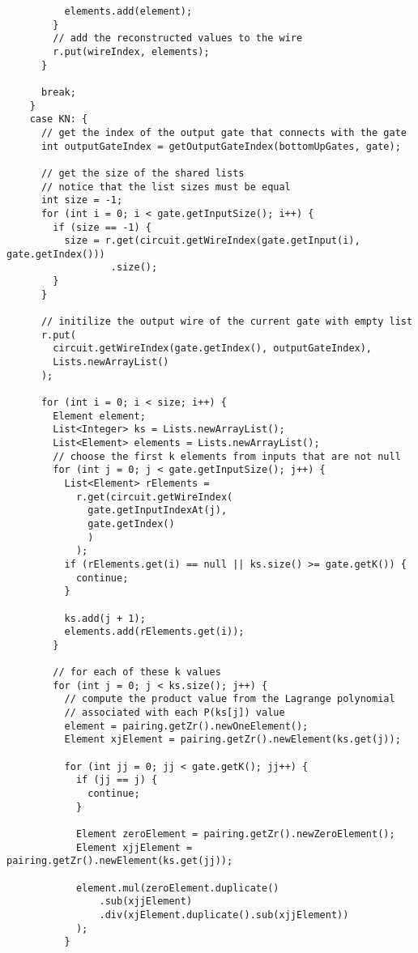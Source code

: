 \documentclass[12pt]{article}
\begin{document}
\begin{lstlisting}
          elements.add(element);
        }
        // add the reconstructed values to the wire
        r.put(wireIndex, elements);
      }

      break;
    }
    case KN: {
      // get the index of the output gate that connects with the gate
      int outputGateIndex = getOutputGateIndex(bottomUpGates, gate);

      // get the size of the shared lists
      // notice that the list sizes must be equal
      int size = -1;
      for (int i = 0; i < gate.getInputSize(); i++) {
        if (size == -1) {
          size = r.get(circuit.getWireIndex(gate.getInput(i), gate.getIndex()))
                  .size();
        }
      }

      // initilize the output wire of the current gate with empty list
      r.put(
        circuit.getWireIndex(gate.getIndex(), outputGateIndex), 
        Lists.newArrayList()
      );
      
      for (int i = 0; i < size; i++) {
        Element element;
        List<Integer> ks = Lists.newArrayList();
        List<Element> elements = Lists.newArrayList();
        // choose the first k elements from inputs that are not null
        for (int j = 0; j < gate.getInputSize(); j++) {
          List<Element> rElements = 
            r.get(circuit.getWireIndex(
              gate.getInputIndexAt(j), 
              gate.getIndex()
              )
            );
          if (rElements.get(i) == null || ks.size() >= gate.getK()) {
			continue;
		  }

          ks.add(j + 1);
          elements.add(rElements.get(i));
        }

        // for each of these k values
        for (int j = 0; j < ks.size(); j++) {
          // compute the product value from the Lagrange polynomial
          // associated with each P(ks[j]) value
          element = pairing.getZr().newOneElement();
          Element xjElement = pairing.getZr().newElement(ks.get(j));

          for (int jj = 0; jj < gate.getK(); jj++) {
            if (jj == j) {
              continue;
            }

            Element zeroElement = pairing.getZr().newZeroElement();
            Element xjjElement = pairing.getZr().newElement(ks.get(jj));

            element.mul(zeroElement.duplicate()
                .sub(xjjElement)
                .div(xjElement.duplicate().sub(xjjElement))
            );
          }


\end{lstlisting}
\end{document}

